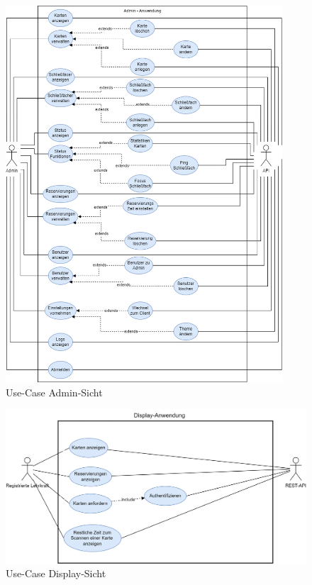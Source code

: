 \begin{figure}[h!]
  \centering
  \includegraphics[width=0.92\textwidth]{FLUTTER/images/ZB/admin_use_case.png}
  \caption{Use-Case Admin-Sicht \cite{Flutter-Architektur-SVG}}
\end{figure} 
\newpage

\begin{figure}[h!]
  \centering
  \includegraphics[width=1\textwidth]{FLUTTER/images/GP/display-use-case.png}
  \caption{Use-Case Display-Sicht \cite{Flutter-Architektur-SVG}}
\end{figure} 

